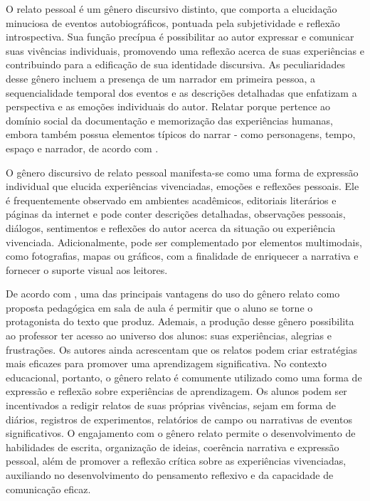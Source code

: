 \documentclass[portuguese]{textolivre}
\begin{document}
O relato pessoal é um gênero discursivo distinto, que comporta a elucidação minuciosa de eventos autobiográficos, pontuada pela subjetividade e reflexão introspectiva. Sua função precípua é possibilitar ao autor expressar e comunicar suas vivências individuais, promovendo uma reflexão acerca de suas experiências e contribuindo para a edificação de sua identidade discursiva. As peculiaridades desse gênero incluem a presença de um narrador em primeira pessoa, a sequencialidade temporal dos eventos e as descrições detalhadas que enfatizam a perspectiva e as emoções individuais do autor. Relatar porque pertence ao domínio social da documentação e memorização das experiências humanas, embora também possua elementos típicos do narrar - como personagens, tempo, espaço e narrador, de acordo com \textcite{schneuwly2004}.

O gênero discursivo de relato pessoal manifesta-se como uma forma de expressão individual que elucida experiências vivenciadas, emoções e reflexões pessoais. Ele é frequentemente observado em ambientes acadêmicos, editoriais literários e páginas da internet e pode conter descrições detalhadas, observações pessoais, diálogos, sentimentos e reflexões do autor acerca da situação ou experiência vivenciada. Adicionalmente, pode ser complementado por elementos multimodais, como fotografias, mapas ou gráficos, com a finalidade de enriquecer a narrativa e fornecer o suporte visual aos leitores.

De acordo com \textcite{oliveira2016}, uma das principais vantagens do uso do gênero relato como proposta pedagógica em sala de aula é permitir que o aluno se torne o protagonista do texto que produz. Ademais, a produção desse gênero possibilita ao professor ter acesso ao universo dos alunos: suas experiências, alegrias e frustrações. Os autores ainda acrescentam que os relatos podem criar estratégias mais eficazes para promover uma aprendizagem significativa. No contexto educacional, portanto, o gênero relato é comumente utilizado como uma forma de expressão e reflexão sobre experiências de aprendizagem. Os alunos podem ser incentivados a redigir relatos de suas próprias vivências, sejam em forma de diários, registros de experimentos, relatórios de campo ou narrativas de eventos significativos. O engajamento com o gênero relato permite o desenvolvimento de habilidades de escrita, organização de ideias, coerência narrativa e expressão pessoal, além de promover a reflexão crítica sobre as experiências vivenciadas, auxiliando no desenvolvimento do pensamento reflexivo e da capacidade de comunicação eficaz.
\end{document}
